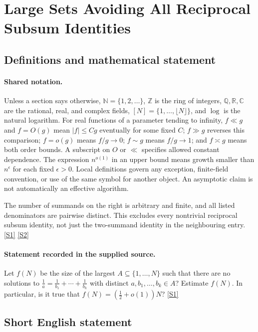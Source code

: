 \documentclass[11pt,a4paper]{article}
\newcommand{\N}{\mathbb{N}}
\newcommand{\Z}{\mathbb{Z}}
\newcommand{\Q}{\mathbb{Q}}
\newcommand{\R}{\mathbb{R}}
\newcommand{\C}{\mathbb{C}}
\newcommand{\sref}[2]{\hyperlink{source:#1:#2}{[S#2]}}
\begin{document}
\section{Large Sets Avoiding All Reciprocal Subsum Identities}\label{statement}


\subsection{Definitions and mathematical statement}

\paragraph{Shared notation.}Unless a section says otherwise, $\N=\{1,2,\ldots\}$,
$\Z$ is the ring of integers, $\Q,\R,\C$ are the rational, real, and complex
fields, $[N]=\{1,\ldots,\lfloor N\rfloor\}$, and $\log$ is the natural
logarithm. For real functions of a parameter tending to infinity,
$f\ll g$ and $f=O(g)$ mean $|f|\leq Cg$ eventually for some fixed $C$;
$f\gg g$ reverses this comparison; $f=o(g)$ means $f/g\to0$;
$f\sim g$ means $f/g\to1$; and $f\asymp g$ means both order bounds.
A subscript on $O$ or $\ll$ specifies allowed constant dependence.
The expression $n^{o(1)}$ in an upper bound means growth smaller than
$n^\epsilon$ for each fixed $\epsilon>0$. Local definitions govern any
exception, finite-field convention, or use of the same symbol for another
object. An asymptotic claim is not automatically an effective algorithm.



The number of summands on the right is arbitrary and finite, and all listed denominators are pairwise distinct. This excludes every nontrivial reciprocal subsum identity, not just the two-summand identity in the neighbouring entry. \sref{statement}{1} \sref{statement}{2}

\paragraph{Statement recorded in the supplied source.}
Let $f(N)$ be the size of the largest $A\subseteq \{1,\ldots,N\}$ such that there are no solutions to $ \frac{1}{a}= \frac{1}{b_1}+\cdots+\frac{1}{b_k} $ with distinct $a,b_1,\ldots,b_k\in A$?
Estimate $f(N)$. In particular, is it true that $f(N)=(\tfrac{1}{2}+o(1))N$? \sref{statement}{1}

\subsection{Short English statement}
\end{document}
